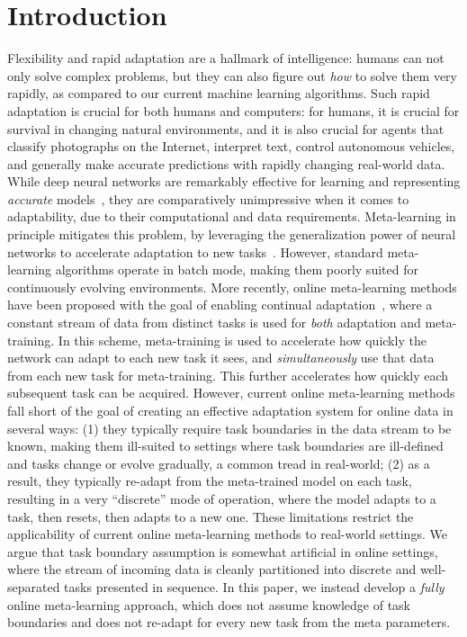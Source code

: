 \section{Introduction}


Flexibility and rapid adaptation are a hallmark of intelligence: humans can not only solve complex problems, but they can also figure out \emph{how} to solve them very rapidly, as compared to our current machine learning algorithms. Such rapid adaptation is crucial for both humans and computers: for humans, it is crucial for survival in changing natural environments, and it is also crucial for agents that classify photographs on the Internet, interpret text, control autonomous vehicles, and generally make accurate predictions with rapidly changing real-world data. While deep neural networks are remarkably effective for learning and representing \emph{accurate} models~\citep{he2015deep, krizhevsky2012imagenet, simonyan2014very, szegedy2015going}, they are comparatively unimpressive when it comes to adaptability, due to their computational and data requirements. Meta-learning in principle mitigates this problem, by leveraging the generalization power of neural networks to accelerate adaptation to new tasks~\citep{finn19a, li2017meta, nichol2018first, nichol2018reptile, park2019meta, antoniou2018train}. However, standard meta-learning algorithms operate in batch mode, making them poorly suited for continuously evolving environments. More recently, online meta-learning methods have been proposed with the goal of enabling continual adaptation~\citep{finn19a, jerfel2018reconciling, yao2020online, nagabandi2018deep, li2020online}, where a constant stream of data from distinct tasks is used for  \emph{both} adaptation and meta-training. In this scheme, meta-training is used to accelerate how quickly the network can adapt to each new task it sees, and \emph{simultaneously} use that data from each new task for meta-training. This further accelerates how quickly each subsequent task can be acquired. However, current online meta-learning methods fall short of the goal of creating an effective adaptation system for online data in several ways: (1) they typically require task boundaries in the data stream to be known, making them ill-suited to settings where task boundaries are ill-defined and tasks change or evolve gradually, a common tread in real-world; (2) as a result, they typically re-adapt from the meta-trained model on each task, resulting in a very ``discrete'' mode of operation, where the model adapts to a task, then resets, then adapts to a new one. These limitations restrict the applicability of current online meta-learning methods to real-world settings. We argue that task boundary assumption is somewhat artificial in online settings, where the stream of incoming data is cleanly partitioned into discrete and well-separated tasks presented in sequence. In this paper, we instead develop a \emph{fully} online meta-learning approach, which does not assume knowledge of task boundaries and does not re-adapt for every new task from the meta parameters.



